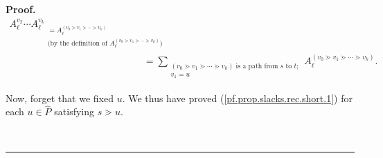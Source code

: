 \documentclass[numbers=enddot,12pt,final,onecolumn,notitlepage]{scrartcl}%
\theoremstyle{definition}
\newenvironment{vershort}{}{}
\newcommand{\downslack}{A}
\newenvironment{proof}[1][Proof]{\noindent\textbf{#1.} }{\ \rule{0.5em}{0.5em}}
\let\sumnonlimits\sum
\renewcommand{\sum}{\sumnonlimits\limits}
\begin{document}
\begin{vershort}
\begin{proof}
\begin{align}
{\downslack_{\ell}^{v_{2}}\cdots\downslack_{\ell}^{v_{k}}}%
_{\substack{=\downslack_{\ell}^{\left(  v_{0}\gtrdot v_{1}\gtrdot\cdots\gtrdot
v_{k}\right)  }\\\text{(by the definition of }\downslack_{\ell}^{\left(
v_{0}\gtrdot v_{1}\gtrdot\cdots\gtrdot v_{k}\right)  }\text{)}}}\nonumber\\
&  =\sum_{\substack{\left(  v_{0}\gtrdot v_{1}\gtrdot\cdots\gtrdot
v_{k}\right)  \text{ is a path from }s\text{ to }t;\\v_{1}=u}}\downslack_{\ell
}^{\left(  v_{0}\gtrdot v_{1}\gtrdot\cdots\gtrdot v_{k}\right)  }.
\label{pf.prop.slacks.rec.short.1}%
\end{align}


Now, forget that we fixed $u$. We thus have proved
(\ref{pf.prop.slacks.rec.short.1}) for each $u\in\widehat{P}$ satisfying
$s\gtrdot u$.


\end{proof}
\end{vershort}
\end{document}
